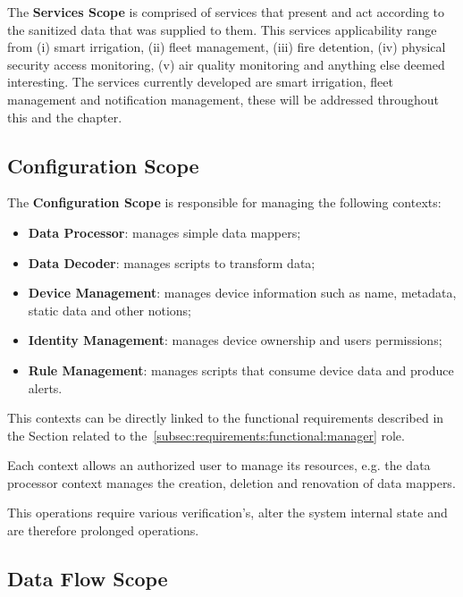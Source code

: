The \textbf{Services Scope} is comprised of services that present and act according to the sanitized data that was supplied to them. This services applicability range from (i) smart irrigation, (ii) fleet management, (iii) fire detention, (iv) physical security access monitoring, (v) air quality monitoring and anything else deemed interesting. The services currently developed are smart irrigation, fleet management and notification management, these will be addressed throughout this and the  chapter.

\subsection{Configuration Scope}
\label{subsec:design:system_scopes:configuration_scope}

The \textbf{Configuration Scope} is responsible for managing the following contexts:

\begin{itemize}
   \item \textbf{Data Processor}: manages simple data mappers;
   \item \textbf{Data Decoder}: manages scripts to transform data;
   \item \textbf{Device Management}: manages device information such as name, metadata, static data and other notions;
   \item \textbf{Identity Management}: manages device ownership and users permissions;
   \item \textbf{Rule Management}: manages scripts that consume device data and produce alerts.
\end{itemize}

This contexts can be directly linked to the functional requirements described in the Section related to the~\ref{subsec:requirements:functional:manager} role.

Each context allows an authorized user to manage its resources, e.g. the data processor context manages the creation, deletion and renovation of data mappers.

This operations require various verification's, alter the system internal state and are therefore prolonged operations.

\subsection{Data Flow Scope}
\label{subsec:design:system_scopes:data_flow_scope}

